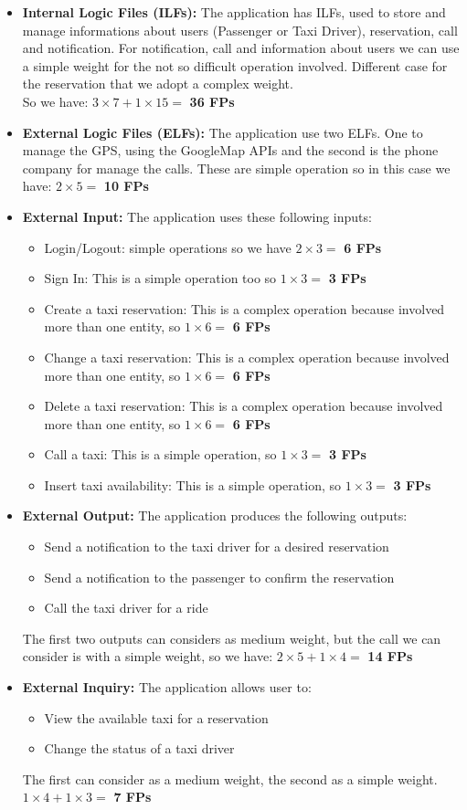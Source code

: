 \documentclass[12pt, oneside]{book}   	%
\begin{document}
\begin{itemize}
\item \textbf{Internal Logic Files (ILFs):} The application has ILFs, used to store and manage informations about users (Passenger or Taxi Driver), reservation, call and notification.
For notification, call and information about users we can use a simple weight for the not so difficult operation involved. Different case for the reservation that we adopt a complex weight.
\\
So we have: $3 \times 7 +  1 \times 15 = $\textbf{ 36 FPs}
\item \textbf{External Logic Files (ELFs):} The application use two ELFs. One to manage the GPS, using the GoogleMap APIs and the second is the phone company for manage the calls.
These are simple operation so in this case we have: $2 \times 5= $\textbf{ 10 FPs}
\item \textbf{External Input:} The application uses these following inputs:
\begin{itemize}
\item Login/Logout: simple operations so we have $2 \times 3= $\textbf{ 6 FPs}
\item Sign In: This is a simple operation too so $1 \times 3= $\textbf{ 3 FPs}
\item Create a taxi reservation: This is a complex operation because involved more than one entity, so $1 \times 6= $\textbf{ 6 FPs}
\item Change a taxi reservation: This is a complex operation because involved more than one entity, so $1 \times 6= $\textbf{ 6 FPs}
\item Delete a taxi reservation: This is a complex operation because involved more than one entity, so $1 \times 6= $\textbf{ 6 FPs}
\item Call a taxi: This is a simple operation, so $1 \times 3= $\textbf{ 3 FPs}
\item Insert taxi availability: This is a simple operation, so $1 \times 3= $\textbf{ 3 FPs}
\end{itemize}
\item \textbf{External Output:} The application produces the following outputs: 
\begin{itemize}
\item Send a notification to the taxi driver for a desired reservation
\item Send a notification to the passenger to confirm the reservation
\item Call the taxi driver for a ride
\end{itemize}
The first two outputs can considers as medium weight, but the call we can consider is with a simple weight, so we have: $2 \times 5 + 1 \times 4= $\textbf{ 14 FPs}
\item \textbf{External Inquiry:} The application allows user to:
\begin{itemize}
\item View the available taxi for a reservation
\item Change the status of a taxi driver
\end{itemize}
The first can consider as a medium weight, the second as a simple weight.
$1 \times 4 + 1 \times 3= $\textbf{ 7 FPs}
\end{itemize}
\end{document}
